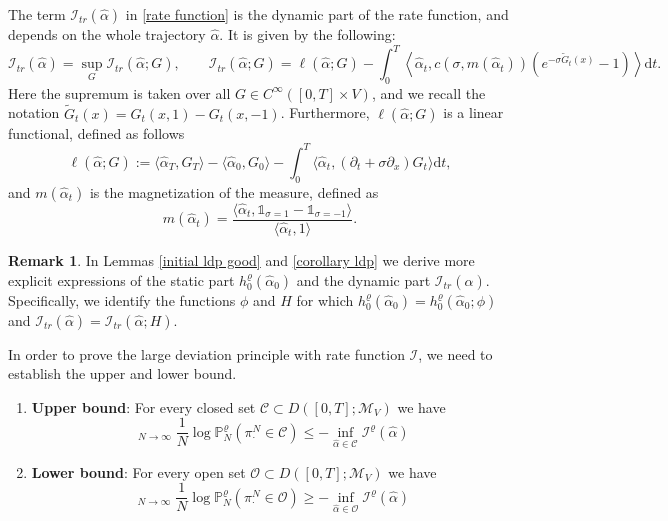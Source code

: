 \documentclass[11pt]{article}
\numberwithin{equation}{section}
\DeclareMathOperator*\uplim{\overline{lim}}
\DeclareMathOperator*\lowlim{\underline{lim}}
\theoremstyle{definition}
\newtheorem{Remark}{Remark}[section]
\theoremstyle{plain}
\newcommand{\dd}{\mathrm{d}}
\begin{document}
The term $\mathcal{I}_{tr}(\widehat{\alpha})$ in \eqref{rate function} is the dynamic part of the rate function, and depends on the whole trajectory $\widehat{\alpha}$. It is given by the following:
    \begin{equation}\label{dynamic ldp}
        \mathcal{I}_{tr}(\widehat{\alpha}) = \sup_G \mathcal{I}_{tr}(\widehat{\alpha};G),
        \qquad \mathcal{I}_{tr}(\widehat{\alpha};G) = \ell(\widehat{\alpha}; G) -  \int_0^T \left< \widehat{\alpha}_t, c(\sigma, m(\widehat{\alpha}_t)) \left(e^{-\sigma \widetilde{G}_t(x)} -1\right)\right>\dd t.
    \end{equation}
Here the supremum is taken over all $G\in C^\infty([0,T]\times V)$, and we recall the notation $\widetilde{G}_t(x) = G_t(x,1) - G_t(x,-1)$. Furthermore, $\ell(\widehat{\alpha};G)$ is a linear functional, defined as follows
    \begin{equation}\label{ell}
        \ell(\widehat{\alpha};G) := \langle \widehat{\alpha}_T, G_T\rangle - \langle \widehat{\alpha}_0, G_0\rangle - \int_0^T \langle \widehat{\alpha}_t, (\partial_t + \sigma \partial_x) G_t\rangle \dd t,
    \end{equation}
and $m(\widehat{\alpha}_t)$ is the magnetization of the measure, defined as 
    \begin{equation}
        m(\widehat{\alpha}_t) = \frac{\langle\widehat{\alpha}_t,\mathds{1}_{\sigma=1} - \mathds{1}_{\sigma=-1}\rangle  }{\langle \widehat{\alpha}_t, 1\rangle}.
    \end{equation}
\begin{Remark}
    In Lemmas \ref{initial ldp good} and \ref{corollary ldp} we derive more explicit expressions of the static part $h_0^\varrho(\widehat{\alpha}_0)$ and the dynamic part $\mathcal{I}_{tr}(\widehat{\alpha})$. Specifically, we identify the functions $\phi$ and $H$ for which $h_0^\varrho(\widehat{\alpha}_0) = h_0^\varrho(\widehat{\alpha}_0;\phi)$ and $\mathcal{I}_{tr}(\widehat{\alpha}) = \mathcal{I}_{tr}(\widehat{\alpha};H)$.
\end{Remark}
In order to prove the large deviation principle with rate function $\mathcal{I}$, we need to establish the upper and lower bound.
\begin{enumerate}[label=\roman*.,font=\itshape]
    \item \textbf{Upper bound}: For every closed set $\mathcal{C} \subset  D([0,T];\mathcal{M}_V)$ we have 
        \begin{equation}\label{upper bound def}
            \uplim_{N\to\infty} \frac{1}{N} \log \mathbb{P}_N^{\varrho}(\pi^N_{\cdot} \in \mathcal{C}) \leq -\inf_{\widehat{\alpha} \in \mathcal{C}} \mathcal{I}^{\varrho}(\widehat{\alpha})
        \end{equation}
    \item \textbf{Lower bound}: For every open set $\mathcal{O} \subset  D([0,T];\mathcal{M}_V)$ we have  
        \begin{equation}\label{lower bound def}
            \lowlim_{N\to\infty} \frac{1}{N} \log \mathbb{P}_N^{\varrho}(\pi^N_{\cdot} \in \mathcal{O}) \geq -\inf_{\widehat{\alpha} \in \mathcal{O}} \mathcal{I}^{\varrho}(\widehat{\alpha})
        \end{equation}
\end{enumerate}
\end{document}
